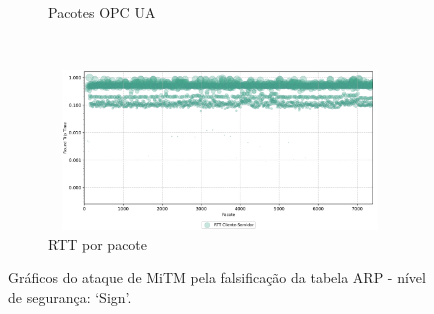 \begin{apendicesenv}
\begin{figure}[htbp!]
\begin{subfigure}[t]{0.5\textwidth}
        \caption{Pacotes OPC UA}
    \end{subfigure}%
    ~
    \begin{subfigure}[t]{0.5\textwidth}
        \centering
        \includegraphics[width=1\textwidth, height=120pt]{USPSC-img/output/cropped/1-mitm_arp-rttp.png}
        \caption{RTT por pacote}
    \end{subfigure}%
    \label{fig:1-mitm_arp}
    \caption{Gráficos do ataque de MiTM pela falsificação da tabela ARP - nível de segurança: `Sign'.}
\end{figure}


\end{apendicesenv}
